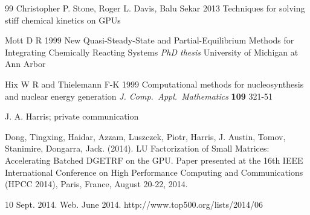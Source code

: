 \documentclass[]{elsart}
\begin{document}
\begin{thebibliography} {99}
Christopher P. Stone, Roger L. Davis, Balu Sekar 2013 Techniques for solving stiff chemical kinetics on GPUs

Mott D R 1999 New Quasi-Steady-State and Partial-Equilibrium
Methods for Integrating Chemically Reacting Systems {\em PhD thesis} University
of Michigan at Ann Arbor

Hix W R and Thielemann F-K 1999 Computational methods for
nucleosynthesis and nuclear energy generation {\em J. Comp.\ Appl.\ Mathematics}
{\bf 109} 321-51

 J. A. Harris; private communication

Dong, Tingxing, Haidar, Azzam, Luszczek, Piotr, Harris, J. 
Austin, Tomov, Stanimire, Dongarra, Jack. (2014). LU Factorization of Small 
Matrices: Accelerating Batched DGETRF on the GPU. Paper presented at the 
16th IEEE International Conference on High Performance Computing and 
Communications (HPCC 2014), Paris, France, August 20-22, 2014.

 10 Sept. 2014.
Web. June 2014. http://www.top500.org/lists/2014/06

\end{thebibliography}
\end{document}
